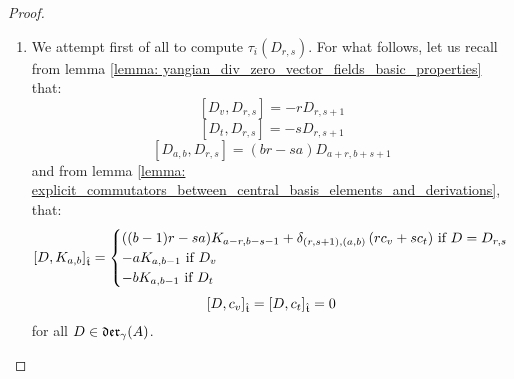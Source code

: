 \begin{proof}
                \begin{enumerate}
                    \item We attempt first of all to compute $\tau_i(D_{r, s})$. For what follows, let us recall from lemma \ref{lemma: yangian_div_zero_vector_fields_basic_properties} that:
                        $$[D_v, D_{r, s}] = -r D_{r, s + 1}$$
                        $$[D_t, D_{r, s}] = -s D_{r, s + 1}$$
                        $$[D_{a, b}, D_{r, s}] = (br - sa) D_{a + r, b + s + 1}$$
                    and from lemma \ref{lemma: explicit_commutators_between_central_basis_elements_and_derivations}, that:
                        $$[D, K_{a, b}]_{\hat{\mathfrak{t}}} =
                            \begin{cases}
                                \text{$((b - 1)r - sa) K_{a - r, b - s - 1} + \delta_{(r, s + 1), (a, b)} \left( r c_v + s c_t \right)$ if $D = D_{r, s}$}
                                \\
                                \text{$-a K_{a, b - 1}$ if $D_v$}
                                \\
                                \text{$-b K_{a, b - 1}$ if $D_t$}
                            \end{cases}
                        $$
                        $$[D, c_v]_{\hat{\mathfrak{t}}} = [D, c_t]_{\hat{\mathfrak{t}}} = 0$$
                    for all $D \in \mathfrak{der}_{\gamma}(A)$.
                    

\end{enumerate}
\end{proof}
